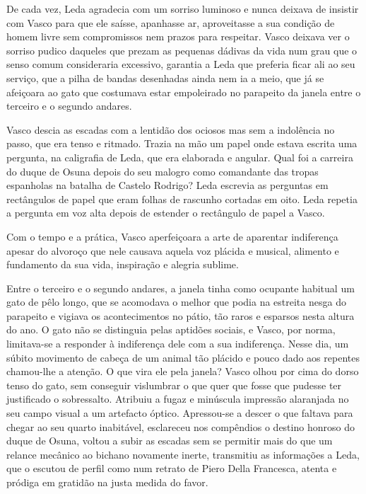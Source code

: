 De cada vez, Leda agradecia com um sorriso luminoso e nunca deixava de
insistir com Vasco para que ele saísse, apanhasse ar, aproveitasse a sua
condição de homem livre sem compromissos nem prazos para respeitar.
Vasco deixava ver o sorriso pudico daqueles que prezam as pequenas
dádivas da vida num grau que o senso comum consideraria excessivo, garantia a Leda que preferia ficar ali ao seu serviço, que a pilha de
bandas desenhadas ainda nem ia a meio, que já se afeiçoara ao gato que
costumava estar empoleirado no parapeito da janela entre o terceiro e o
segundo andares.

Vasco descia as escadas com a lentidão dos ociosos mas sem a indolência
no passo, que era tenso e ritmado. Trazia na mão um papel onde estava
escrita uma pergunta, na caligrafia de Leda, que era elaborada e
angular. Qual foi a carreira do duque de Osuna depois do seu malogro
como comandante das tropas espanholas na batalha de Castelo Rodrigo?
Leda escrevia as perguntas em rectângulos de papel que eram folhas de
rascunho cortadas em oito. Leda repetia a pergunta em voz alta depois de
estender o rectângulo de papel a Vasco.



Com o tempo e a prática, Vasco aperfeiçoara a arte de aparentar
indiferença apesar do alvoroço que nele causava aquela voz plácida e
musical, alimento e fundamento da sua vida, inspiração e alegria
sublime.

Entre o terceiro e o segundo andares, a janela tinha como ocupante
habitual um gato de pêlo longo, que se acomodava o melhor que podia na
estreita nesga do parapeito e vigiava os acontecimentos no pátio, tão
raros e esparsos nesta altura do ano. O gato não se distinguia pelas
aptidões sociais, e Vasco, por norma, limitava-se a responder à
indiferença dele com a sua indiferença. Nesse dia, um súbito movimento
de cabeça de um animal tão plácido e pouco dado aos repentes chamou-lhe a atenção. O que vira ele pela janela? Vasco olhou por cima do
dorso tenso do gato, sem conseguir vislumbrar o que quer que fosse que
pudesse ter justificado o sobressalto. Atribuiu a fugaz e minúscula
impressão alaranjada no seu campo visual a um artefacto óptico.
Apressou-se a descer o que faltava para chegar ao seu quarto inabitável,
esclareceu nos compêndios o destino honroso do duque de Osuna, voltou
a subir as escadas sem se permitir mais do que um relance mecânico ao
bichano novamente inerte, transmitiu as informações a Leda, que o
escutou de perfil como num retrato de Piero Della Francesca, atenta e
pródiga em gratidão na justa medida do favor.


